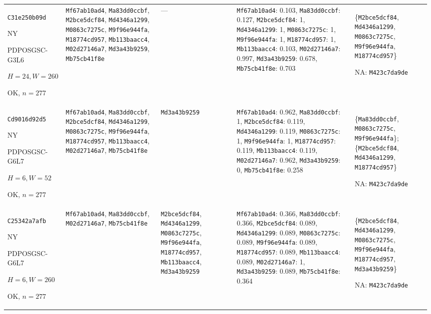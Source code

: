 \begin{longtable}{p{.15\linewidth}p{.17\linewidth}p{.17\linewidth}p{.25\linewidth}p{.14\linewidth}}
\texttt{C31e250b09d}\par NY\par PDPOSGSC-\allowbreak{}G3L6\par $H=24,W=260$\par OK, $n=277$ & \texttt{Mf67ab10ad4}, \texttt{Ma83dd0ccbf}, \texttt{M2bce5dcf84}, \texttt{Md4346a1299}, \texttt{M0863c7275c}, \texttt{M9f96e944fa}, \texttt{M18774cd957}, \texttt{Mb113baacc4}, \texttt{M02d27146a7}, \texttt{Md3a43b9259}, \texttt{Mb75cb41f8e} & --- & \texttt{Mf67ab10ad4}: 0.103, \texttt{Ma83dd0ccbf}: 0.127, \texttt{M2bce5dcf84}: 1, \texttt{Md4346a1299}: 1, \texttt{M0863c7275c}: 1, \texttt{M9f96e944fa}: 1, \texttt{M18774cd957}: 1, \texttt{Mb113baacc4}: 0.103, \texttt{M02d27146a7}: 0.997, \texttt{Md3a43b9259}: 0.678, \texttt{Mb75cb41f8e}: 0.703 & \{\texttt{M2bce5dcf84}, \texttt{Md4346a1299}, \texttt{M0863c7275c}, \texttt{M9f96e944fa}, \texttt{M18774cd957}\}\par NA: \texttt{M423c7da9de} \\
\texttt{Cd9016d92d5}\par NY\par PDPOSGSC-\allowbreak{}G6L7\par $H=6,W=52$\par OK, $n=277$ & \texttt{Mf67ab10ad4}, \texttt{Ma83dd0ccbf}, \texttt{M2bce5dcf84}, \texttt{Md4346a1299}, \texttt{M0863c7275c}, \texttt{M9f96e944fa}, \texttt{M18774cd957}, \texttt{Mb113baacc4}, \texttt{M02d27146a7}, \texttt{Mb75cb41f8e} & \texttt{Md3a43b9259} & \texttt{Mf67ab10ad4}: 0.962, \texttt{Ma83dd0ccbf}: 1, \texttt{M2bce5dcf84}: 0.119, \texttt{Md4346a1299}: 0.119, \texttt{M0863c7275c}: 1, \texttt{M9f96e944fa}: 1, \texttt{M18774cd957}: 0.119, \texttt{Mb113baacc4}: 0.119, \texttt{M02d27146a7}: 0.962, \texttt{Md3a43b9259}: 0, \texttt{Mb75cb41f8e}: 0.258 & \{\texttt{Ma83dd0ccbf}, \texttt{M0863c7275c}, \texttt{M9f96e944fa}\}; \{\texttt{M2bce5dcf84}, \texttt{Md4346a1299}, \texttt{M18774cd957}\}\par NA: \texttt{M423c7da9de} \\
\texttt{C25342a7afb}\par NY\par PDPOSGSC-\allowbreak{}G6L7\par $H=6,W=260$\par OK, $n=277$ & \texttt{Mf67ab10ad4}, \texttt{Ma83dd0ccbf}, \texttt{M02d27146a7}, \texttt{Mb75cb41f8e} & \texttt{M2bce5dcf84}, \texttt{Md4346a1299}, \texttt{M0863c7275c}, \texttt{M9f96e944fa}, \texttt{M18774cd957}, \texttt{Mb113baacc4}, \texttt{Md3a43b9259} & \texttt{Mf67ab10ad4}: 0.366, \texttt{Ma83dd0ccbf}: 0.366, \texttt{M2bce5dcf84}: 0.089, \texttt{Md4346a1299}: 0.089, \texttt{M0863c7275c}: 0.089, \texttt{M9f96e944fa}: 0.089, \texttt{M18774cd957}: 0.089, \texttt{Mb113baacc4}: 0.089, \texttt{M02d27146a7}: 1, \texttt{Md3a43b9259}: 0.089, \texttt{Mb75cb41f8e}: 0.364 & \{\texttt{M2bce5dcf84}, \texttt{Md4346a1299}, \texttt{M0863c7275c}, \texttt{M9f96e944fa}, \texttt{M18774cd957}, \texttt{Md3a43b9259}\}\par NA: \texttt{M423c7da9de} \\

\end{longtable}
